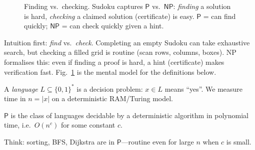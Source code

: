\begin{figure}[h]\centering
{}
\caption{Finding vs.\ checking. Sudoku captures $\mathsf{P}$ vs.\ $\mathsf{NP}$: \emph{finding} a solution is hard, \emph{checking} a claimed solution (certificate) is easy. $\mathsf{P}$ = can find quickly; $\mathsf{NP}$ = can check quickly given a hint.}
\label{fig:find-vs-check}
\end{figure}
Intuition first: \emph{find} vs.\ \emph{check}. Completing an empty Sudoku can take exhaustive search, but checking a filled grid is routine (scan rows, columns, boxes). NP formalises this: even if finding a proof is hard, a hint (certificate) makes verification fast. Fig.~\ref{fig:find-vs-check} is the mental model for the definitions below.

A \emph{language} $L\subseteq\{0,1\}^*$ is a decision problem: $x\in L$ means ``yes''.
We measure time in $n=|x|$ on a deterministic RAM/Turing model.

\begin{definition}
$\mathsf{P}$ is the class of languages decidable by a deterministic algorithm in polynomial time, i.e.\ $O(n^c)$ for some constant $c$.
\end{definition}
Think: sorting, BFS, Dijkstra are in $\mathsf{P}$---routine even for large $n$ when $c$ is small.

